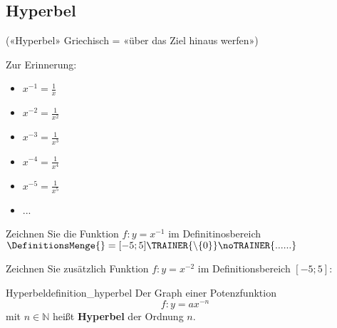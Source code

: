 
\subsection{Hyperbel}

(«Hyperbel» Griechisch = «über das Ziel hinaus werfen»)


Zur Erinnerung:
\begin{multicols}{2}
\begin{itemize}
	\item $x^{-1} = \frac{1}{x}$
	\item $x^{-2} = \frac{1}{x^2}$
	\item $x^{-3} = \frac{1}{x^3}$
	\item $x^{-4} = \frac{1}{x^4}$
	\item $x^{-5} = \frac{1}{x^5}$
  \item ...
\end{itemize}
\end{multicols}

Zeichnen Sie die Funktion $f: y = x^{-1}$ im Definitinosbereich
$\DefinitionsMenge{} = [-5;5]\TRAINER{\backslash \{0\}}\noTRAINER{......}$


\newpage


Zeichnen Sie zusätzlich Funktion $f: y = x^{-2}$ im Definitionsbereich $[-5;5]$:


\begin{definition}{Hyperbel}{definition_hyperbel}
  Der Graph einer Potenzfunktion $$f: y=ax^{-n}$$
  mit $n \in \mathbb{N}$ heißt
\textbf{Hyperbel} der Ordnung $n$.
\end{definition}

